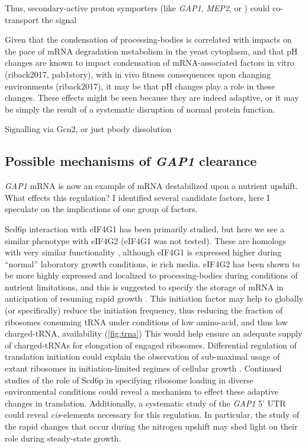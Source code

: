 Thus, secondary-active proton symporters (like \textit{GAP1},
\textit{MEP2}, or ) could co-transport the signal

\parencite{kim2012need}

Given that the condensation of processing-bodies is correlated with
impacts on the pace of mRNA degradation metabolism in the yeast
cytoplasm, and that pH changes are known to impact condensation
of mRNA-associated factors in vitro (riback2017, pab1story), 
with in vivo fitness consequences
upon changing environments (riback2017),
it may be that pH changes play a role in these changes.
These effects might be seen because they are indeed adaptive, 
or it may be simply the result of a systematic disruption of 
normal protein function.

Signalling via Gcn2, or just pbody dissolution

\subsection{Possible mechanisms of \textit{GAP1} clearance}

\textit{GAP1} mRNA is now an example of mRNA destabilized upon
a nutrient upshift. What effects this regulation?
I identified several candidate factors, here I speculate on the
implications of one group of factors.

Scd6p interaction with eIF4G1 has been primarily studied, 
but here we see a similar phenotype with eIF4G2 
(eIF4G1 was not tested). These are
homologs with very similar functionality
\parencite{clarkson2010functional}, 
although eIF4G1 is expressed higher
during “normal” laboratory growth conditions, ie rich media. 
eIF4G2 has been shown to be more highly expressed and localized to
processing-bodies during conditions of nutrient limitations, and
this is suggested to specify the storage of mRNA in anticipation of
resuming rapid growth \parencite{brengues2007accumulation}.
This initiation factor may help to globally (or specifically)
reduce the initiation frequency, thus reducing the fraction of
ribosomes consuming tRNA under conditions of low amino-acid,
and thus low charged-tRNA, availability (\autoref{fig:trna})
This would help ensure an adequate
supply of charged-tRNAs for elongation of engaged ribosomes.
Differential regulation of 
translation initiation could explain the observation of sub-maximal
usage of extant ribosomes in initiation-limited regimes of cellular
growth \parencite{kafri2016cost,metzl2017principles}.
Continued studies of the role of Scd6p in specifying ribosome
loading in diverse environmental conditions could reveal a mechanism
to effect these adaptive changes in translation.
Additionally, a systematic study of the \textit{GAP1} 5' UTR could
reveal \textit{cis}-elements necessary for this regulation.
In particular, the study of the rapid changes that occur during the
nitrogen upshift may shed light on their role during steady-state
growth.

